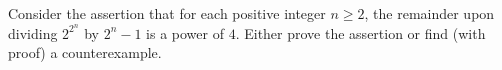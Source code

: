 Consider the assertion that for each positive integer $n\geq2$, the remainder upon dividing $2^{2^n}$ by $2^n-1$ is a power of $4$.  Either prove the assertion or find (with proof) a counterexample.